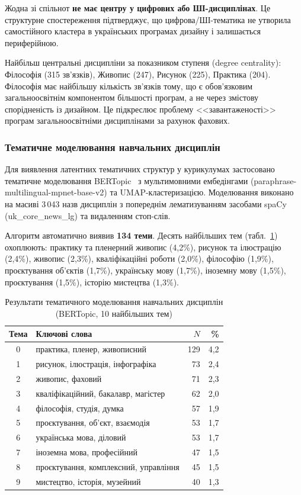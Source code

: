Жодна зі спільнот \textbf{не має центру у цифрових або ШІ-дисциплінах}. Це структурне спостереження підтверджує, що цифрова/ШІ-тематика не утворила самостійного кластера в українських програмах дизайну і залишається периферійною.

Найбільш центральні дисципліни за показником ступеня (degree centrality): Філософія (315 зв'язків), Живопис (247), Рисунок (225), Практика (204). Філософія має найбільшу кількість зв'язків тому, що є обов'язковим загальноосвітнім компонентом більшості програм, а не через змістову спорідненість із дизайном. Це підкреслює проблему <<завантаженості>> програм загальноосвітніми дисциплінами за рахунок фахових.

\subsubsection{Тематичне моделювання навчальних дисциплін}\label{sssec:2.1.3}

Для виявлення латентних тематичних структур у курикулумах застосовано тематичне моделювання BERTopic~\cite{Musiienko2025DesignEducation} з мультимовними ембедінгами (paraphrase-multilingual-mpnet-base-v2) та UMAP-кластеризацією. Моделювання виконано на масиві 3\,043 назв дисциплін з попереднім лематизуванням засобами spaCy (uk\_core\_news\_lg) та видаленням стоп-слів.

Алгоритм автоматично виявив \textbf{134 теми}. Десять найбільших тем (табл.~\ref{tab:topic-modeling}) охоплюють: практику та пленерний живопис (4,2\%), рисунок та ілюстрацію (2,4\%), живопис (2,3\%), кваліфікаційні роботи (2,0\%), філософію (1,9\%), проєктування об'єктів (1,7\%), українську мову (1,7\%), іноземну мову (1,5\%), проєктування (1,5\%), історію мистецтва (1,3\%).

\begin{table}[htbp]
\centering
\caption{Результати тематичного моделювання навчальних дисциплін (BERTopic, 10 найбільших тем)}\label{tab:topic-modeling}
\small
\begin{tabularx}{\textwidth}{@{}cXrr@{}}
\toprule
\textbf{Тема} & \textbf{Ключові слова} & \textbf{$N$} & \textbf{\%} \\
\midrule
0 & практика, пленер, живописний & 129 & 4,2 \\
1 & рисунок, ілюстрація, інфографіка & 73 & 2,4 \\
2 & живопис, фаховий & 71 & 2,3 \\
3 & кваліфікаційний, бакалавр, магістер & 62 & 2,0 \\
4 & філософія, студія, думка & 57 & 1,9 \\
5 & проєктування, об'єкт, взаємодія & 53 & 1,7 \\
6 & українська мова, діловий & 53 & 1,7 \\
7 & іноземна мова, професійний & 47 & 1,5 \\
8 & проєктування, комплексний, управління & 45 & 1,5 \\
9 & мистецтво, історія, музейний & 40 & 1,3 \\
\bottomrule
\end{tabularx}
\end{table}

